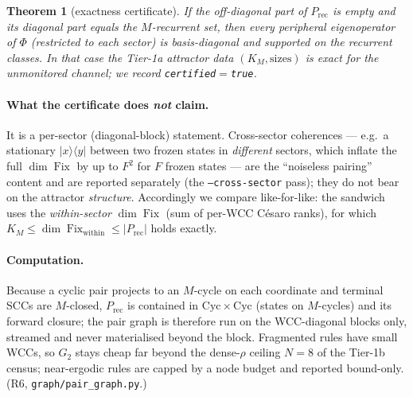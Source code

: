\documentclass[11pt]{article}
\newcommand{\rt}[1]{\texttt{#1}}
\newcommand{\fn}[1]{\texttt{#1}}
\providecommand{\ket}[1]{|#1\rangle}
\providecommand{\bra}[1]{\langle #1|}
\newcommand{\Fix}{\operatorname{Fix}}
\newcommand{\Prec}{P_{\mathrm{rec}}}
\newcommand{\GG}{G_2}
\theoremstyle{plain}
\newtheorem{theorem}{Theorem}
\theoremstyle{definition}
\begin{document}
\begin{theorem}[exactness certificate]\label{thm:t4}
If the off-diagonal part of $\Prec$ is empty and its diagonal part equals the
$M$-recurrent set, then every peripheral eigenoperator of $\Phi$ (restricted to
each sector) is basis-diagonal and supported on the recurrent classes. In that
case the Tier-1a attractor data $(K_M,\text{sizes})$ is \emph{exact} for the
unmonitored channel; we record \fn{certified}$=$\rt{true}.
\end{theorem}

\paragraph{What the certificate does \emph{not} claim.} It is a per-sector
(diagonal-block) statement. Cross-sector coherences --- e.g.\ a stationary
$\ket{x}\bra{y}$ between two frozen states in \emph{different} sectors, which
inflate the full $\dim\Fix$ by up to $F^2$ for $F$ frozen states --- are the
``noiseless pairing'' content and are reported separately (the
\fn{--cross-sector} pass); they do not bear on the attractor \emph{structure}.
Accordingly we compare like-for-like: the sandwich uses the \emph{within-sector}
$\dim\Fix$ (sum of per-WCC C\'esaro ranks), for which
$K_M\le\dim\Fix_{\text{within}}\le|\Prec|$ holds exactly.

\paragraph{Computation.} Because a cyclic pair projects to an $M$-cycle on each
coordinate and terminal SCCs are $M$-closed, $\Prec$ is contained in
$\mathrm{Cyc}\times\mathrm{Cyc}$ (states on $M$-cycles) and its forward closure;
the pair graph is therefore run on the WCC-diagonal blocks only, streamed and
never materialised beyond the block. Fragmented rules have small WCCs, so $\GG$
stays cheap far beyond the dense-$\rho$ ceiling $N=8$ of the Tier-1b census;
near-ergodic rules are capped by a node budget and reported bound-only. (R6,
\fn{graph/pair\_graph.py}.)
\end{document}
